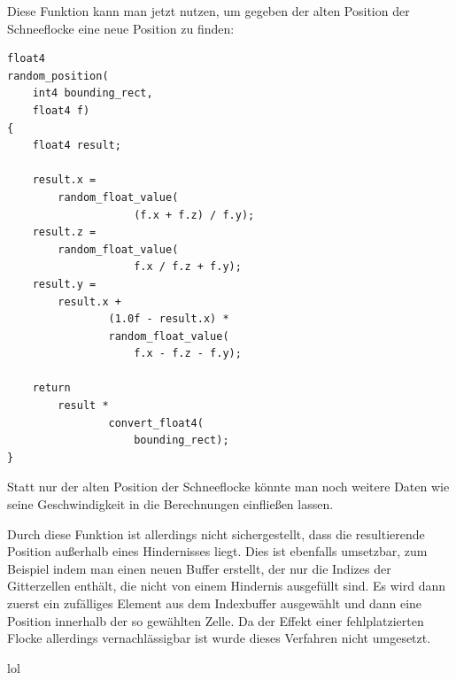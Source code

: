 Diese Funktion kann man jetzt nutzen, um gegeben der alten Position
der Schneeflocke eine neue Position zu finden:

\begin{verbatim}
float4
random_position(
	int4 bounding_rect,
	float4 f)
{
	float4 result;

	result.x =
		random_float_value(
                    (f.x + f.z) / f.y);
	result.z =
		random_float_value(
                    f.x / f.z + f.y);
	result.y =
		result.x +
                (1.0f - result.x) *
                random_float_value(
                    f.x - f.z - f.y);

	return
		result *
                convert_float4(
                    bounding_rect);
}
\end{verbatim}

Statt nur der alten Position der Schneeflocke könnte man noch weitere
Daten wie seine Geschwindigkeit in die Berechnungen einfließen lassen.

Durch diese Funktion ist allerdings nicht sichergestellt, dass die
resultierende Position außerhalb eines Hindernisses liegt. Dies ist
ebenfalls umsetzbar, zum Beispiel indem man einen neuen Buffer erstellt,
der nur die Indizes der Gitterzellen enthält, die nicht von einem Hindernis
ausgefüllt sind. Es wird dann zuerst ein zufälliges Element aus dem
Indexbuffer ausgewählt und dann eine Position innerhalb der so gewählten
Zelle. Da der Effekt einer fehlplatzierten Flocke allerdings
vernachlässigbar ist wurde dieses Verfahren nicht
umgesetzt.

lol
